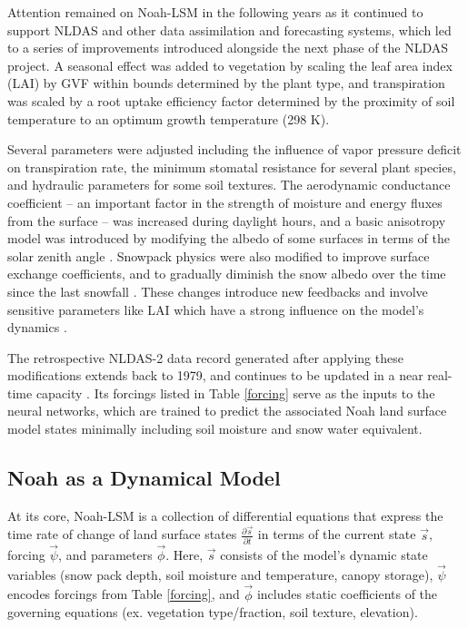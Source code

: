 \documentclass[11pt]{article}
\begin{document}
\begin{multicols}{2}

    Attention remained on Noah-LSM in the following years as it continued to support NLDAS and other data assimilation and forecasting systems, which led to a series of improvements introduced alongside the next phase of the NLDAS project. A seasonal effect was added to vegetation by scaling the leaf area index (LAI) by GVF within bounds determined by the plant type, and transpiration was scaled by a root uptake efficiency factor determined by the proximity of soil temperature to an optimum growth temperature (298 K).

    Several parameters were adjusted including the influence of vapor pressure deficit on transpiration rate, the minimum stomatal resistance for several plant species, and hydraulic parameters for some soil textures. The aerodynamic conductance coefficient -- an important factor in the strength of moisture and energy fluxes from the surface -- was increased during daylight hours, and a basic anisotropy model was introduced by modifying the albedo of some surfaces in terms of the solar zenith angle \cite{wei_improvement_2011}. Snowpack physics were also modified to improve surface exchange coefficients, and to gradually diminish the snow albedo over the time since the last snowfall \cite{livneh_noah_2010}\cite{liang_simple_1994}. These changes introduce new feedbacks and involve sensitive parameters like LAI which have a strong influence on the model's dynamics \cite{rosero_quantifying_2010}.

    The retrospective NLDAS-2 data record generated after applying these modifications extends back to 1979, and continues to be updated in a near real-time capacity \cite{xia_continental-scale_2012}. Its forcings listed in Table \ref{forcing} serve as the inputs to the neural networks, which are trained to predict the associated Noah land surface model states minimally including soil moisture and snow water equivalent.


    \subsection{Noah as a Dynamical Model}

    At its core, Noah-LSM is a collection of differential equations that express the time rate of change of land surface states $\frac{\partial \vec{s}}{\partial t}$ in terms of the current state $\vec{s}$, forcing $\vec{\psi}$, and parameters $\vec{\phi}$. Here, $\vec{s}$ consists of the model's dynamic state variables (snow pack depth, soil moisture and temperature, canopy storage), $\vec{\psi}$ encodes forcings from Table \ref{forcing}, and $\vec{\phi}$ includes static coefficients of the governing equations (ex. vegetation type/fraction, soil texture, elevation).


\end{multicols}
\end{document}
